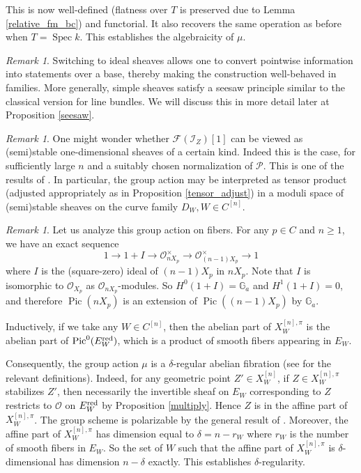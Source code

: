 \documentclass{amsart}
\theoremstyle{plain}
\theoremstyle{definition}
\theoremstyle{remark}
\newtheorem{remark}[theorem]{Remark}
\begin{document}
    This is now well-defined (flatness over $T$ is preserved due to Lemma \ref{relative_fm_bc}) and functorial.
    It also recovers the same operation as before when $T=\operatorname{Spec}k$.
    This establishes the algebraicity of $\mu$.
    \begin{remark}
        Switching to ideal sheaves allows one to convert pointwise information into statements over a base, thereby making the construction well-behaved in families.
        More generally, simple sheaves satisfy a seesaw principle similar to the classical version for line bundles.
        We will discuss this in more detail later at Proposition \ref{seesaw}.
    \end{remark}
    \begin{remark}\label{stablesh}
        One might wonder whether $\mathcal F(\mathcal I_Z)[1]$ can be viewed as (semi)stable one-dimensional sheaves of a certain kind.
        Indeed this is the case, for sufficiently large $n$ and a suitably chosen normalization of $\mathcal P$.
        This is one of the results of \cite[Theorem 3.15]{yos}.
        In particular, the group action may be interpreted as tensor product (adjusted appropriately as in Proposition \ref{tensor_adjust}) in a moduli space of (semi)stable sheaves on the curve family $D_W,W\in C^{[n]}$.
    \end{remark}
    \begin{remark}\label{deltareg}
        Let us analyze this group action on fibers.
        For any $p\in C$ and $n\ge 1$, we have an exact sequence
        \[
        1\to 1+I\to \mathcal O_{nX_p}^\times\to\mathcal O_{(n-1)X_p}^\times\to 1
        \]
        where $I$ is the (square-zero) ideal of $(n-1)X_p$ in $nX_p$.
        Note that $I$ is isomorphic to $\mathcal O_{X_p}$ as $\mathcal O_{nX_p}$-modules.
        So $H^0(1+I)=\mathbb G_a$ and $H^1(1+I)=0$, and therefore $\operatorname{Pic}(nX_p)$ is an extension of $\operatorname{Pic}((n-1)X_p)$ by $\mathbb G_a$.

        Inductively, if we take any $W\in C^{[n]}$, then the abelian part of $X^{[n],\pi}_W$ is the abelian part of $\operatorname{Pic}^0(E_W^{\rm red})$, which is a product of smooth fibers appearing in $E_W$.

        Consequently, the group action $\mu$ is a $\delta$-regular abelian fibration (see \cite{ngo} for the relevant definitions).
        Indeed, for any geometric point $Z'\in X^{[n]}_W$, if $Z\in X^{[n],\pi}_W$ stabilizes $Z'$, then necessarily the invertible sheaf on $E_W$ corresponding to $Z$ restricts to $\mathcal O$ on $E_W^{\rm red}$ by Proposition \ref{multiply}.
        Hence $Z$ is in the affine part of $X^{[n],\pi}_W$.
        The group scheme is polarizable by the general result of \cite{polaris}.
        Moreover, the affine part of $X^{[n],\pi}_W$ has dimension equal to $\delta=n-r_W$ where $r_W$ is the number of smooth fibers in $E_W$.
        So the set of $W$ such that the affine part of $X^{[n],\pi}_W$ is $\delta$-dimensional has dimension $n-\delta$ exactly.
        This establishes $\delta$-regularity.
    \end{remark}
\end{document}
